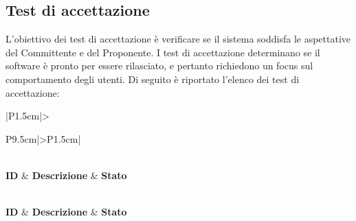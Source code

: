\subsection{Test di accettazione}

\par L'obiettivo dei test di accettazione è verificare se il sistema soddisfa le aspettative del Committente e del Proponente. I test di accettazione determinano se il software è pronto per essere rilasciato, e pertanto richiedono un focus sul comportamento degli utenti. Di seguito è riportato l'elenco dei test di accettazione:

\bgroup
\begin{adjustwidth}{-0.5cm}{-0.5cm}
 	\begin{longtable}{|P{1.5cm}|>{\raggedright}P{9.5cm}|>{\arraybackslash}P{1.5cm}|}
    \caption{Test di accettazione}
  	\label{tab:test-accettazione} \\
	  \hline
		\textbf{ID} & \textbf{Descrizione} & \textbf{Stato} \\
		\hline
		\endfirsthead

    \caption[]{Test di accettazione (continua)} \\
		\hline
		\textbf{ID} & \textbf{Descrizione} & \textbf{Stato} \\
		\hline
		\endhead

		\hline
		 \\
		\hline
		\endfoot

		\hline
		\endlastfoot


\end{longtable}
\end{adjustwidth}
